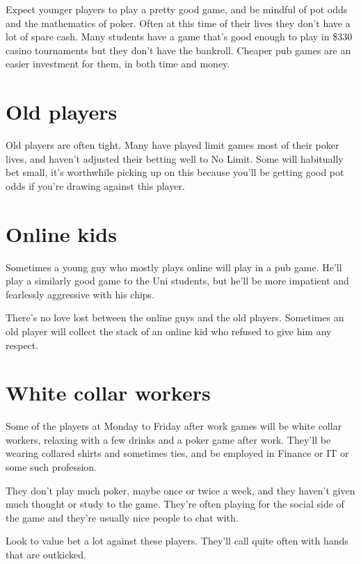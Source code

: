 Expect younger players to play a pretty good game, and be mindful of pot
odds and the mathematics of poker. Often at this time of their lives
they don't have a lot of spare cash. Many students have a game that's
good enough to play in \$330 casino tournaments but they don't have
the bankroll. Cheaper pub games are an easier investment for them,
in both time and money.

\section{Old players}

Old players are often tight. Many have played limit games most of their
poker lives, and haven't adjusted their betting well to No Limit. Some
will habitually bet small, it's worthwhile picking up on this because
you'll be getting good pot odds if you're drawing against this player.

\section{Online kids}

Sometimes a young guy who mostly plays online will play in a pub game.
He'll play a similarly good game to the Uni students, but he'll be
more impatient and fearlessly aggressive with his chips.

There's no love lost between the online guys and the old players. Sometimes
an old player will collect the stack of an online kid who refused to
give him any respect.

\section{White collar workers}

Some of the players at Monday to Friday after work games will be white
collar workers, relaxing with a few drinks and a poker game after work.
They'll be wearing collared shirts and sometimes ties, and be employed
in Finance or IT or some such profession.

They don't play much poker, maybe once or twice a week, and they haven't
given much thought or study to the game. They're often playing for the
social side of the game and they're usually nice people to chat with.

Look to value bet a lot against these players. They'll call quite often
with hands that are outkicked.


